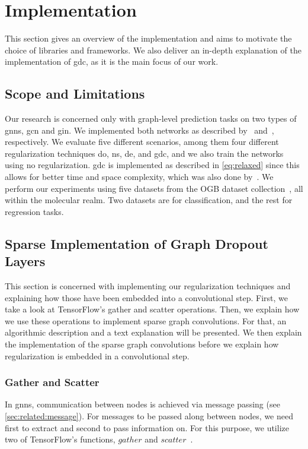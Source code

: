 \chapter{Implementation}
\label{sec:implement}
This section gives an overview of the implementation and aims to motivate the choice of libraries and frameworks.
We also deliver an in-depth explanation of the implementation of \ac{gdc}, as it is the main focus of our work.
\section{Scope and Limitations}
\label{sec:implement:scope}
Our research is concerned only with graph-level prediction tasks on two types of \acp{gnn}, \ac{gcn} and \ac{gin}.
We implemented both networks as described by~\citet{Kipf2017} and~\citet{Xu2019}, respectively.
We evaluate five different scenarios, among them four different regularization techniques \ac{do}, \ac{ns}, \ac{de}, and \ac{gdc}, and we also train the networks using no regularization.
\Ac{gdc} is implemented as described in \cref{eq:relaxed} since this allows for better time and space complexity, which was also done by~\citet{Hasanzadeh2020}.
We perform our experiments using five datasets from the OGB dataset collection~\cite{Hu2020}, all within the molecular realm.
Two datasets are for classification, and the rest for regression tasks.

\section{Sparse Implementation of Graph Dropout Layers}
This section is concerned with implementing our regularization techniques and explaining how those have been embedded into a convolutional step.
First, we take a look at TensorFlow's gather and scatter operations.
Then, we explain how we use these operations to implement sparse graph convolutions.
For that, an algorithmic description and a text explanation will be presented.
We then explain the implementation of the sparse graph convolutions before we explain how regularization is embedded in a convolutional step.
\label{sec:implement:gnndropout}
\subsection{Gather and Scatter}
\label{sec:implement:gnndropout:gatherscatter}
In \acp{gnn}, communication between nodes is achieved via message passing (see \cref{sec:related:message}).
For messages to be passed along between nodes, we need first to extract and second to pass information on.
For this purpose, we utilize two of TensorFlow's functions, $\mathit{gather}$ and $\mathit{scatter}$~\cite{He2007,Damke2020}.

